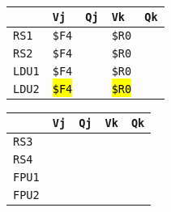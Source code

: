 \begin{enumerate}
    \begin{minipage}{0.45\textwidth}
        \centering
        \begin{tabular}{@{} l | l l l l @{}}
            \toprule
                & \texttt{Vj} & \texttt{Qj} & \texttt{Vk} & \texttt{Qk} \\
            \midrule
            \texttt{RS1} & \texttt{\$F4} & & \texttt{\$R0} & \\ [.3em]
            \texttt{RS2} & \texttt{\$F4} & & \texttt{\$R0} & \\
            \cmidrule{1-5}
            \texttt{LDU1} & \texttt{\$F4} & & \texttt{\$R0} & \\ [.3em]
            \texttt{LDU2} & \hl{\texttt{\$F4}} & & \hl{\texttt{\$R0}} & \\
            \bottomrule
        \end{tabular}
    \end{minipage}
    \hfill
    \begin{minipage}{0.45\textwidth}
        \centering
        \begin{tabular}{@{} l | l l l l @{}}
            \toprule
            & \texttt{Vj} & \texttt{Qj} & \texttt{Vk} & \texttt{Qk} \\
            \midrule
            \texttt{RS3} & & & & \\ [.3em]
            \texttt{RS4} & & & & \\
            \cmidrule{1-5}
            \texttt{FPU1} & & & & \\ [.3em]
            \texttt{FPU2} & & & & \\
            \bottomrule
        \end{tabular}
    \end{minipage}


\end{enumerate}
